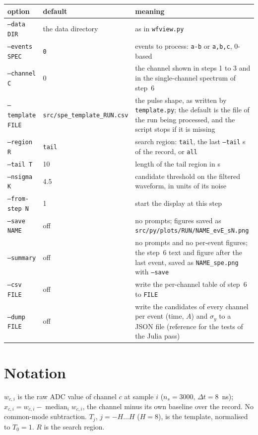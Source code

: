 \documentclass[11pt]{article}
\newcommand{\code}[1]{\texttt{#1}}
\newcommand{\us}{\textmu s}
\begin{document}
\begin{center}
\begin{tabular}{l l p{74mm}}
\toprule
option & default & meaning \\
\midrule
\code{--data DIR} & the data directory & as in \code{wfview.py} \\
\code{--events SPEC} & \code{0} & events to process: \code{a-b} or \code{a,b,c}, 0-based \\
\code{--channel C} & 0 & the channel shown in steps 1 to 3 and in the single-channel spectrum of step~6 \\
\code{--template FILE} & \code{src/spe\_template\_RUN.csv} & the pulse shape, as written by \code{template.py}; the default is the file of the run being processed, and the script stops if it is missing \\
\code{--region R} & \code{tail} & search region: \code{tail}, the last \code{--tail} \us{} of the record, or \code{all} \\
\code{--tail T} & 10 & length of the tail region in \us \\
\code{--nsigma K} & 4.5 & candidate threshold on the filtered waveform, in units of its noise \\
\code{--from-step N} & 1 & start the display at this step \\
\code{--save NAME} & off & no prompts; figures saved as \code{src/py/plots/RUN/NAME\_evE\_sN.png} \\
\code{--summary} & off & no prompts and no per-event figures; the step~6 text and figure after the last event, saved as \code{NAME\_spe.png} with \code{--save} \\
\code{--csv FILE} & off & write the per-channel table of step~6 to \code{FILE} \\
\code{--dump FILE} & off & write the candidates of every channel per event (time, $A$) and $\sigma_y$ to a JSON file (reference for the tests of the Julia pass) \\
\bottomrule
\end{tabular}
\end{center}

\section{Notation}

$w_{c,i}$ is the raw ADC value of channel $c$ at sample $i$ ($n_s =
3000$, $\Delta t = 8$~ns); $x_{c,i} = w_{c,i} - \operatorname{median}_i
w_{c,i}$, the channel minus its own baseline over the record. No
common-mode subtraction. $T_j$, $j = -H \dots H$ ($H = 8$), is the
template, normalised to $T_0 = 1$. $R$ is the search region.
\end{document}
